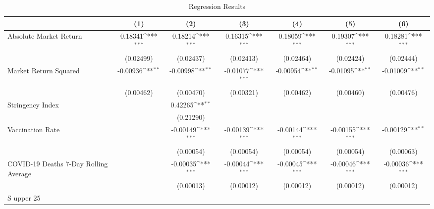 \begin{table}[htbp]\centering
\def\sym#1{\ifmmode^{#1}\else\(^{#1}\)\fi}
\caption{Regression Results \label{reg1}}
\begin{tabular}{l*{6}{c}}
\toprule
                    &\multicolumn{1}{c}{(1)}         &\multicolumn{1}{c}{(2)}         &\multicolumn{1}{c}{(3)}         &\multicolumn{1}{c}{(4)}         &\multicolumn{1}{c}{(5)}         &\multicolumn{1}{c}{(6)}         \\
\midrule
Absolute Market Return&     0.18341\sym{***}&     0.18214\sym{***}&     0.16315\sym{***}&     0.18059\sym{***}&     0.19307\sym{***}&     0.18281\sym{***}\\
                    &   (0.02499)         &   (0.02437)         &   (0.02413)         &   (0.02464)         &   (0.02424)         &   (0.02444)         \\
\addlinespace
Market Return Squared&    -0.00936\sym{**} &    -0.00998\sym{**} &    -0.01077\sym{***}&    -0.00954\sym{**} &    -0.01095\sym{**} &    -0.01009\sym{**} \\
                    &   (0.00462)         &   (0.00470)         &   (0.00321)         &   (0.00462)         &   (0.00460)         &   (0.00476)         \\
\addlinespace
Stringency Index    &                     &     0.42265\sym{**} &                     &                     &                     &                     \\
                    &                     &   (0.21290)         &                     &                     &                     &                     \\
\addlinespace
Vaccination Rate    &                     &    -0.00149\sym{***}&    -0.00139\sym{***}&    -0.00144\sym{***}&    -0.00155\sym{***}&    -0.00129\sym{**} \\
                    &                     &   (0.00054)         &   (0.00054)         &   (0.00054)         &   (0.00054)         &   (0.00063)         \\
\addlinespace
COVID-19 Deaths 7-Day Rolling Average&                     &    -0.00035\sym{***}&    -0.00044\sym{***}&    -0.00045\sym{***}&    -0.00046\sym{***}&    -0.00036\sym{***}\\
                    &                     &   (0.00013)         &   (0.00012)         &   (0.00012)         &   (0.00012)         &   (0.00012)         \\
\addlinespace
S upper 25%

\end{tabular}
\end{table}
